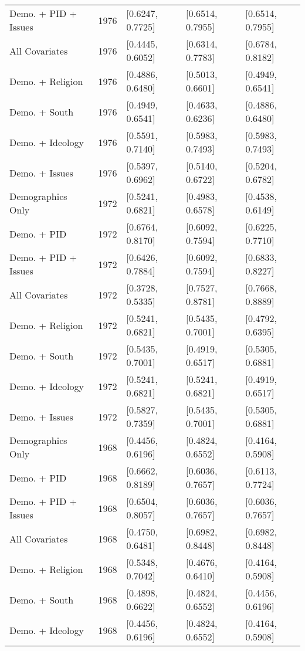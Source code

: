 \begin{longtable}{lrlll}
  Demo. + PID + Issues & 1976 & [0.6247, 0.7725] & [0.6514, 0.7955] & [0.6514, 0.7955] \\ 
  All Covariates & 1976 & [0.4445, 0.6052] & [0.6314, 0.7783] & [0.6784, 0.8182] \\ 
  Demo. + Religion & 1976 & [0.4886, 0.6480] & [0.5013, 0.6601] & [0.4949, 0.6541] \\ 
  Demo. + South & 1976 & [0.4949, 0.6541] & [0.4633, 0.6236] & [0.4886, 0.6480] \\ 
  Demo. + Ideology & 1976 & [0.5591, 0.7140] & [0.5983, 0.7493] & [0.5983, 0.7493] \\ 
  Demo. + Issues & 1976 & [0.5397, 0.6962] & [0.5140, 0.6722] & [0.5204, 0.6782] \\ 
  Demographics Only & 1972 & [0.5241, 0.6821] & [0.4983, 0.6578] & [0.4538, 0.6149] \\ 
  Demo. + PID & 1972 & [0.6764, 0.8170] & [0.6092, 0.7594] & [0.6225, 0.7710] \\ 
  Demo. + PID + Issues & 1972 & [0.6426, 0.7884] & [0.6092, 0.7594] & [0.6833, 0.8227] \\ 
  All Covariates & 1972 & [0.3728, 0.5335] & [0.7527, 0.8781] & [0.7668, 0.8889] \\ 
  Demo. + Religion & 1972 & [0.5241, 0.6821] & [0.5435, 0.7001] & [0.4792, 0.6395] \\ 
  Demo. + South & 1972 & [0.5435, 0.7001] & [0.4919, 0.6517] & [0.5305, 0.6881] \\ 
  Demo. + Ideology & 1972 & [0.5241, 0.6821] & [0.5241, 0.6821] & [0.4919, 0.6517] \\ 
  Demo. + Issues & 1972 & [0.5827, 0.7359] & [0.5435, 0.7001] & [0.5305, 0.6881] \\ 
  Demographics Only & 1968 & [0.4456, 0.6196] & [0.4824, 0.6552] & [0.4164, 0.5908] \\ 
  Demo. + PID & 1968 & [0.6662, 0.8189] & [0.6036, 0.7657] & [0.6113, 0.7724] \\ 
  Demo. + PID + Issues & 1968 & [0.6504, 0.8057] & [0.6036, 0.7657] & [0.6036, 0.7657] \\ 
  All Covariates & 1968 & [0.4750, 0.6481] & [0.6982, 0.8448] & [0.6982, 0.8448] \\ 
  Demo. + Religion & 1968 & [0.5348, 0.7042] & [0.4676, 0.6410] & [0.4164, 0.5908] \\ 
  Demo. + South & 1968 & [0.4898, 0.6622] & [0.4824, 0.6552] & [0.4456, 0.6196] \\ 
  Demo. + Ideology & 1968 & [0.4456, 0.6196] & [0.4824, 0.6552] & [0.4164, 0.5908] \\ 

\end{longtable}
